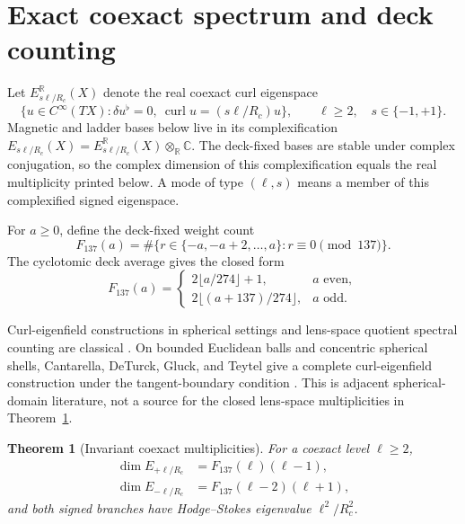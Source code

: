\documentclass[12pt]{article}
\newtheorem{theorem}{Theorem}[section]
\theoremstyle{definition}
\theoremstyle{remark}
\newcommand{\curl}{\operatorname{curl}}
\begin{document}
\section{Exact coexact spectrum and deck counting}\label{sec:spectrum}

Let $E^{\mathbb R}_{s\ell/R_c}(X)$ denote the real coexact curl eigenspace
\[
 \{u\in C^\infty(TX):\delta u^\flat=0,
       \ \curl u=(s\ell/R_c)u\},
 \qquad \ell\ge2,\quad s\in\{-1,+1\}.
\]
Magnetic and ladder bases below live in its complexification
$E_{s\ell/R_c}(X)=E^{\mathbb R}_{s\ell/R_c}(X)\otimes_{\mathbb R}\mathbb C$.
The deck-fixed bases are stable under complex conjugation, so the complex
dimension of this complexification equals the real multiplicity printed
below.  A mode of type $(\ell,s)$ means a member of this complexified signed
eigenspace.

For $a\ge0$, define the deck-fixed weight count
\[
 F_{137}(a)=\#\{r\in\{-a,-a+2,\ldots,a\}:r\equiv0\pmod{137}\}.
\]
The cyclotomic deck average gives the closed form
\begin{equation}\label{eq:F137}
 F_{137}(a)=
 \begin{cases}
 2\lfloor a/274\rfloor+1,&a\text{ even},\\
 2\lfloor(a+137)/274\rfloor,&a\text{ odd}.
 \end{cases}
\end{equation}

Curl-eigenfield constructions in spherical settings and lens-space quotient
spectral counting are classical
\cite{ChandrasekharKendall1957,IkedaYamamoto1979,Ikeda1980Lens,Bar2019,
Lauret2018}.
On bounded Euclidean balls and concentric spherical shells, Cantarella,
DeTurck, Gluck, and Teytel give a complete curl-eigenfield construction under
the tangent-boundary condition
\cite[Theorems~A--B and Sections~III--V]{CantarellaEtAl2000Curl}.  This is
adjacent spherical-domain literature, not a source for the closed lens-space
multiplicities in Theorem~\ref{thm:spectrum}.

\begin{theorem}[Invariant coexact multiplicities]\label{thm:spectrum}
For a coexact level $\ell\ge2$,
\begin{align}
 \dim E_{+\ell/R_c}&=F_{137}(\ell)(\ell-1),\label{eq:plusdim}\\
 \dim E_{-\ell/R_c}&=F_{137}(\ell-2)(\ell+1),\label{eq:minusdim}
\end{align}
and both signed branches have Hodge--Stokes eigenvalue
$\ell^2/R_c^2$.
\end{theorem}
\end{document}

